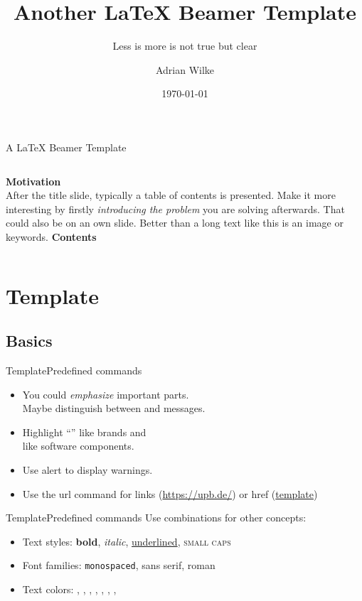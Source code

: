 \documentclass{beamer}
\author[A.~Wilke]{Adrian Wilke}
\institute[dice]{DICE Group\\Paderborn University}
\title[Another LaTeX Beamer Template]{Another LaTeX Beamer Template}
\subtitle{Less is more is not true but clear}
\date{\today}
\begin{document}
{ 
	\frame{\titlepage}
}\addtocounter{framenumber}{-1}

\begin{frame}{A LaTeX Beamer Template}
	\begin{columns}[T]
		\textbf{Motivation}\\\vspace*{.1cm}
		After the title slide, typically a table of contents is presented. Make it more interesting by firstly \emph{introducing the problem} you are solving afterwards. That could also be on an own slide. Better than a long text like this is an image or keywords.
		\hypersetup{linkcolor=urls}
		\textbf{Contents}\vspace*{.3cm}
		\tableofcontents
	\end{columns}
\end{frame}

\section{Template}
\subsection{Basics}

\begin{frame}{Template}{Predefined commands}
	\begin{itemize}
		\item You could \emph{emphasize} important parts. \\Maybe distinguish between  and  messages.
		\item Highlight ``'' like brands and\\  like software components.
		\item Use alert to display \alert{warnings}.
		\item Use the url command for links (\url{https://upb.de/}) or href (\href{https://github.com/adibaba/templates}{template})
	\end{itemize}
\end{frame}

\begin{frame}{Template}{Predefined commands}
	Use combinations for other concepts:
	\begin{itemize}
		\item Text styles: \textbf{bold}, \textit{italic}, \underline{underlined}, \textsc{small caps}
		\item Font families: \texttt{monospaced}, \textsf{sans serif}, \textrm{roman}
		\item Text colors: , , , , , , , 
	\end{itemize}
\end{frame}
\end{document}
